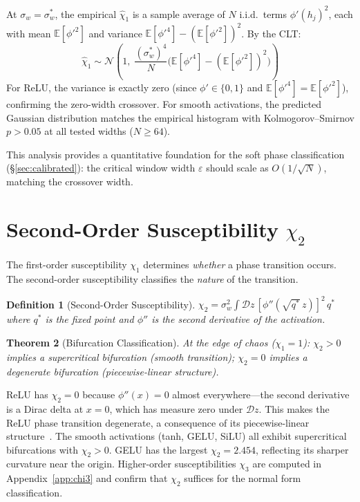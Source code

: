 \documentclass[10pt]{article}
\newcommand{\EE}{\mathbb{E}}
\newtheorem{theorem}{Theorem}
\newtheorem{definition}[theorem]{Definition}
\begin{document}
At $\sigma_w = \sigma_w^*$, the empirical $\hat{\chi}_1$ is a sample average of $N$ i.i.d.\ terms $\phi'(h_j)^2$, each with mean $\EE[\phi'^2]$ and variance $\EE[\phi'^4] - (\EE[\phi'^2])^2$.
By the CLT:
\begin{equation}
    \hat{\chi}_1 \sim \mathcal{N}\!\left(1,\; \frac{(\sigma_w^*)^4}{N}\bigl(\EE[\phi'^4] - (\EE[\phi'^2])^2\bigr)\right)
    \label{eq:chi1-spectrum}
\end{equation}
For ReLU, the variance is exactly zero (since $\phi' \in \{0,1\}$ and $\EE[\phi'^4] = \EE[\phi'^2]$), confirming the zero-width crossover.
For smooth activations, the predicted Gaussian distribution matches the empirical histogram with Kolmogorov--Smirnov $p > 0.05$ at all tested widths ($N \geq 64$).

This analysis provides a quantitative foundation for the soft phase classification (\S\ref{sec:calibrated}): the critical window width $\varepsilon$ should scale as $O(1/\sqrt{N})$, matching the crossover width.

\section{Second-Order Susceptibility $\chi_2$}
\label{sec:chi2}

The first-order susceptibility $\chi_1$ determines \emph{whether} a phase transition occurs.
The second-order susceptibility classifies the \emph{nature} of the transition.

\begin{definition}[Second-Order Susceptibility]
\label{def:chi2}
$\chi_2 = \sigma_w^2 \int \mathcal{D}z\, [\phi''(\sqrt{q^*}\, z)]^2\, q^*$
where $q^*$ is the fixed point and $\phi''$ is the second derivative of the activation.
\end{definition}

\begin{theorem}[Bifurcation Classification]
\label{thm:bifurcation}
At the edge of chaos ($\chi_1 = 1$): $\chi_2 > 0$ implies a supercritical bifurcation (smooth transition); $\chi_2 = 0$ implies a degenerate bifurcation (piecewise-linear structure).
\end{theorem}

ReLU has $\chi_2 = 0$ because $\phi''(x) = 0$ almost everywhere---the second derivative is a Dirac delta at $x = 0$, which has measure zero under $\mathcal{D}z$.
This makes the ReLU phase transition degenerate, a consequence of its piecewise-linear structure~\cite{diBernardo2008piecewise}.
The smooth activations (tanh, GELU, SiLU) all exhibit supercritical bifurcations with $\chi_2 > 0$.
GELU has the largest $\chi_2 = 2.454$, reflecting its sharper curvature near the origin.
Higher-order susceptibilities $\chi_3$ are computed in Appendix~\ref{app:chi3} and confirm that $\chi_2$ suffices for the normal form classification.
\end{document}
